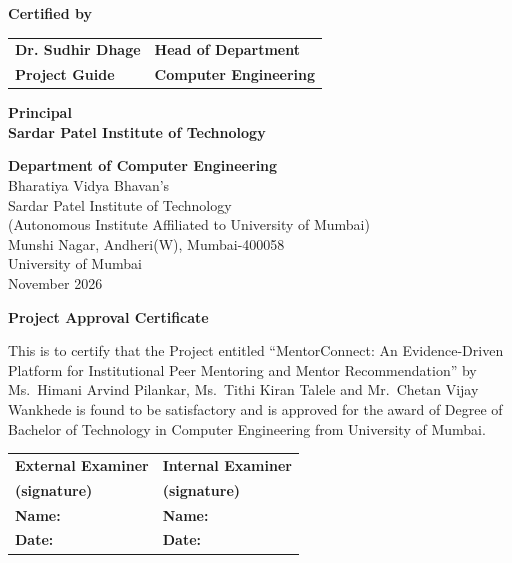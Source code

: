 \documentclass[12pt,a4paper]{report}
\begin{document}
\vspace{2cm}
\begin{center}{\bfseries Certified by}\end{center}
\vspace{2cm}
\noindent\begin{tabular}{@{}p{}@{}p{}@{}}
\textbf{Dr. Sudhir Dhage} & \hfill\textbf{Head of Department}\\
\textbf{Project Guide} & \hfill\textbf{Computer Engineering}
\end{tabular}

\vspace{2.5cm}
\begin{center}
\textbf{Principal}\\
\textbf{Sardar Patel Institute of Technology}
\end{center}
\vfill
\begin{center}
{\bfseries Department of Computer Engineering}\\
Bharatiya Vidya Bhavan's\\ Sardar Patel Institute of Technology\\ (Autonomous Institute Affiliated to University of Mumbai)\\ Munshi Nagar, Andheri(W), Mumbai-400058\\ University of Mumbai\\ November 2026
\end{center}
\clearpage

\thispagestyle{empty}
\begin{center}
\vspace*{1cm}
{\Large\bfseries Project Approval Certificate\par}
\end{center}
\vspace{1.5cm}
\noindent This is to certify that the Project entitled ``MentorConnect: An Evidence-Driven Platform for Institutional Peer Mentoring and Mentor Recommendation'' by Ms.\ Himani Arvind Pilankar, Ms.\ Tithi Kiran Talele and Mr.\ Chetan Vijay Wankhede is found to be satisfactory and is approved for the award of Degree of Bachelor of Technology in Computer Engineering from University of Mumbai.

\vspace{4cm}
\noindent\begin{tabular}{@{}p{}@{}p{}@{}}
\textbf{External Examiner} & \hfill\textbf{Internal Examiner}\\[2.5cm]
\textbf{(signature)} & \hfill\textbf{(signature)}\\[0.8cm]
\textbf{Name:} & \hfill\textbf{Name:}\qquad\qquad\qquad\\[1cm]
\textbf{Date:} & \hfill\textbf{Date:}\qquad\qquad\qquad\;
\end{tabular}
\end{document}

